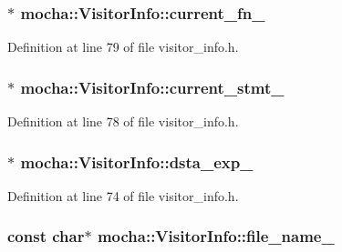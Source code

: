 \hypertarget{classmocha_1_1_visitor_info_a61580002e89ad6a4365e058cd4ee4092}{
\subsubsection[{current\_\-fn\_\-}]{$\ast$ {\bf mocha::VisitorInfo::current\_\-fn\_\-}}}
\label{classmocha_1_1_visitor_info_a61580002e89ad6a4365e058cd4ee4092}


Definition at line 79 of file visitor\_\-info.h.

\hypertarget{classmocha_1_1_visitor_info_a64433c4ddfa5d099664adcab8318d36d}{
\subsubsection[{current\_\-stmt\_\-}]{$\ast$ {\bf mocha::VisitorInfo::current\_\-stmt\_\-}}}
\label{classmocha_1_1_visitor_info_a64433c4ddfa5d099664adcab8318d36d}


Definition at line 78 of file visitor\_\-info.h.

\hypertarget{classmocha_1_1_visitor_info_a967c78fd8536e609808190ef0b56249b}{
\subsubsection[{dsta\_\-exp\_\-}]{$\ast$ {\bf mocha::VisitorInfo::dsta\_\-exp\_\-}}}
\label{classmocha_1_1_visitor_info_a967c78fd8536e609808190ef0b56249b}


Definition at line 74 of file visitor\_\-info.h.

\hypertarget{classmocha_1_1_visitor_info_a4805746226e3c25c280f277cfc4bb37d}{
\subsubsection[{file\_\-name\_\-}]{\setlength{\rightskip}{0pt plus 5cm}const char$\ast$ {\bf mocha::VisitorInfo::file\_\-name\_\-}}}
\label{classmocha_1_1_visitor_info_a4805746226e3c25c280f277cfc4bb37d}


